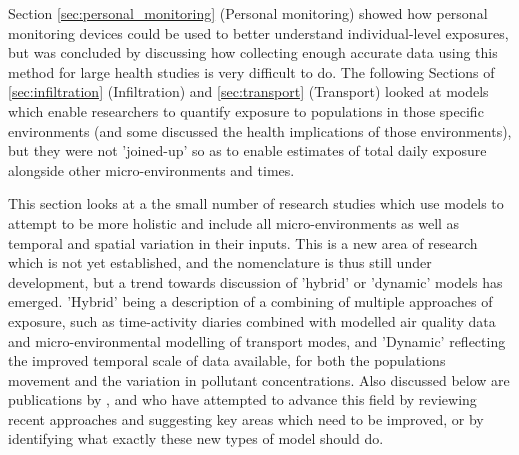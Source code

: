 Section \ref{sec:personal_monitoring} (Personal monitoring) showed how personal monitoring devices could be used to better understand individual-level exposures, but was concluded by discussing how collecting enough accurate data using this method for large health studies is very difficult to do. The following Sections of \ref{sec:infiltration} (Infiltration) and \ref{sec:transport} (Transport) looked at models which enable researchers to quantify exposure to populations in those specific environments (and some discussed the health implications of those environments), but they were not 'joined-up' so as to enable estimates of total daily exposure alongside other micro-environments and times.

This section looks at a the small number of research studies which use models to attempt to be more holistic and include all micro-environments as well as temporal and spatial variation in their inputs. This is a new area of research which is not yet established, and the nomenclature is thus still under development, but a trend towards discussion of 'hybrid' or 'dynamic' models has emerged. 'Hybrid' being a description of a combining of multiple approaches of exposure, such as time-activity diaries combined with modelled air quality data and micro-environmental modelling of transport modes, and 'Dynamic' reflecting the improved temporal scale of data available, for both the populations movement and the variation in pollutant concentrations. Also discussed below are publications by \cite{Ozkaynak2013}, \cite{Meliker2011} and \cite{Baxter2013} who have attempted to advance this field by reviewing recent approaches and suggesting key areas which need to be improved, or by identifying what exactly these new types of model should do. 

